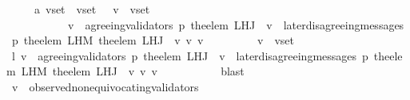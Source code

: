 \begin{isabellebody}
\ \ \ \ \ a{}{\isacharcolon}\ {\isachardoublequoteopen}v{\isacharunderscore}set{\isacharprime}\ {\isasymsubseteq}\ v{\isacharunderscore}set\ {\isasymand}\ {\isacharparenleft}{\isasymforall}\ v{\isacharprime}\ {\isasymin}\ v{\isacharunderscore}set{\isacharprime}{\isachardot}\isanewline
\ \ \ \ \ \ \ \ \ \ \ v{\isacharprime}\ {\isasymin}\ agreeing{\isacharunderscore}validators\ {\isacharparenleft}p{\isacharcomma}\ the{\isacharunderscore}elem\ {\isacharparenleft}L{\isacharunderscore}H{\isacharunderscore}J\ {\isasymsigma}\ v{\isacharparenright}{\isacharparenright}\ {\isasymand}\ later{\isacharunderscore}disagreeing{\isacharunderscore}messages\ {\isacharparenleft}p{\isacharcomma}\ the{\isacharunderscore}elem\ {\isacharparenleft}L{\isacharunderscore}H{\isacharunderscore}M\ {\isacharparenleft}the{\isacharunderscore}elem\ {\isacharparenleft}L{\isacharunderscore}H{\isacharunderscore}J\ {\isasymsigma}\ v{\isacharparenright}{\isacharparenright}\ v{\isacharprime}{\isacharparenright}{\isacharcomma}\ v{\isacharprime}{\isacharcomma}\ {\isasymsigma}{\isacharparenright}\ {\isacharequal}\ {\isasymemptyset}{\isacharparenright}{\isachardoublequoteclose}\ \isanewline
\ \ \ \ \ {\isachardoublequoteopen}v{\isacharprime}\ {\isasymin}\ v{\isacharunderscore}set{\isacharprime}{\isachardoublequoteclose}\isanewline
\ \ \ \ \isamarkupfalse%
\ \isamarkupfalse%
\ l{}{\isacharcolon}\ {\isachardoublequoteopen}v{\isacharprime}\ {\isasymin}\ agreeing{\isacharunderscore}validators\ {\isacharparenleft}p{\isacharcomma}\ the{\isacharunderscore}elem\ {\isacharparenleft}L{\isacharunderscore}H{\isacharunderscore}J\ {\isasymsigma}\ v{\isacharparenright}{\isacharparenright}\ {\isasymand}\ later{\isacharunderscore}disagreeing{\isacharunderscore}messages\ {\isacharparenleft}p{\isacharcomma}\ the{\isacharunderscore}elem\ {\isacharparenleft}L{\isacharunderscore}H{\isacharunderscore}M\ {\isacharparenleft}the{\isacharunderscore}elem\ {\isacharparenleft}L{\isacharunderscore}H{\isacharunderscore}J\ {\isasymsigma}\ v{\isacharparenright}{\isacharparenright}\ v{\isacharprime}{\isacharparenright}{\isacharcomma}\ v{\isacharprime}{\isacharcomma}\ {\isasymsigma}{\isacharparenright}\ {\isacharequal}\ {\isasymemptyset}{\isachardoublequoteclose}\isanewline
\ \ \ \ \ \ \isamarkupfalse%
\ blast\ \ \ \ \ \ \isanewline
\ \ \ \ \isamarkupfalse%
\ {\isachardoublequoteopen}v\ {\isasymin}\ observed{\isacharunderscore}non{\isacharunderscore}equivocating{\isacharunderscore}validators\ {\isasymsigma}{\isachardoublequoteclose}\isanewline

\end{isabellebody}
